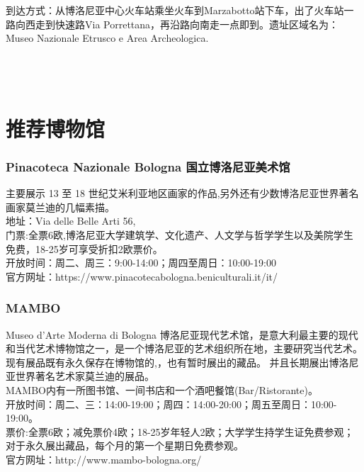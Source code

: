 到达方式：从博洛尼亚中心火车站乘坐火车到Marzabotto站下车，出了火车站一路向西走到快速路Via Porrettana，再沿路向南走一点即到。遗址区域名为：Museo Nazionale Etrusco e Area Archeologica.
\\
\\
\\
\\

\section{推荐博物馆}

\subsubsection{Pinacoteca Nazionale Bologna 国立博洛尼亚美术馆}
主要展示 13 至 18 世纪艾米利亚地区画家的作品,另外还有少数博洛尼亚世界著名画家莫兰迪的几幅素描。\\
地址：Via delle Belle Arti 56, \\
门票:全票6欧,博洛尼亚大学建筑学、文化遗产、人文学与哲学学生以及美院学生免费，18-25岁可享受折扣2欧票价。\\
开放时间：周二、周三：9:00-14:00；周四至周日：10:00-19:00\\
官方网址：https://www.pinacotecabologna.beniculturali.it/it/

\subsubsection{MAMBO}
Museo d'Arte Moderna di Bologna 博洛尼亚现代艺术馆，是意大利最主要的现代和当代艺术博物馆之一，是一个博洛尼亚的艺术组织所在地，主要研究当代艺术。现有展品既有永久保存在博物馆的,，也有暂时展出的藏品。 并且长期展出博洛尼亚世界著名艺术家莫兰迪的展品。\\ 
MAMBO内有一所图书馆、一间书店和一个酒吧餐馆(Bar/Ristorante)。\\
开放时间：周二、三：14:00-19:00；周四：14:00-20:00；周五至周日：10:00-19:00。\\
票价:全票6欧；减免票价4欧；18-25岁年轻人2欧；大学学生持学生证免费参观；对于永久展出藏品，每个月的第一个星期日免费参观。\\
官方网址：http://www.mambo-bologna.org/

